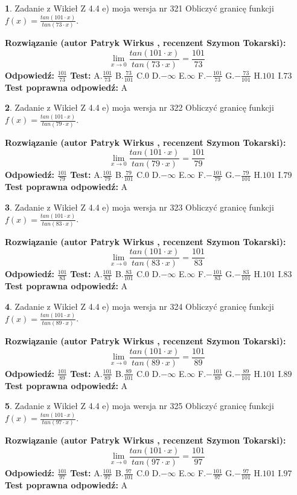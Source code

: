 \documentclass[12pt, a4paper]{article}
\theoremstyle{definition} %
\newtheorem{zad}{}
\newcommand{\zadStart}[1]{\begin{zad}#1\newline}
\newcommand{\zadStop}{\end{zad}}
\newcommand{\rozwStart}[2]{\noindent \textbf{Rozwiązanie (autor #1 , recenzent #2): }\newline}
\newcommand{\rozwStop}{\newline}
\newcommand{\odpStart}{\noindent \textbf{Odpowiedź:}\newline}
\newcommand{\odpStop}{\newline}
\newcommand{\testStart}{\noindent \textbf{Test:}\newline}
\newcommand{\testStop}{\newline}
\newcommand{\kluczStart}{\noindent \textbf{Test poprawna odpowiedź:}\newline}
\newcommand{\kluczStop}{\newline}
\begin{document}
\zadStart{Zadanie z Wikieł Z 4.4 e) moja wersja nr 321}
Obliczyć granicę funkcji $f(x)=\frac{tan(101\cdot x)}{tan(73\cdot x)}$.
\zadStop
\rozwStart{Patryk Wirkus}{Szymon Tokarski}
$$\lim\limits_{x\to 0}\frac{tan(101\cdot x)}{tan(73\cdot x)}=
\frac{101}{73}$$
\rozwStop
\odpStart
$\frac{101}{73}$
\odpStop
\testStart
A.$\frac{101}{73}$
B.$\frac{73}{101}$
C.$0$
D.$-\infty$
E.$\infty$
F.$-\frac{101}{73}$
G.$-\frac{73}{101}$
H.$101$
I.$73$
\testStop
\kluczStart
A
\kluczStop



\zadStart{Zadanie z Wikieł Z 4.4 e) moja wersja nr 322}
Obliczyć granicę funkcji $f(x)=\frac{tan(101\cdot x)}{tan(79\cdot x)}$.
\zadStop
\rozwStart{Patryk Wirkus}{Szymon Tokarski}
$$\lim\limits_{x\to 0}\frac{tan(101\cdot x)}{tan(79\cdot x)}=
\frac{101}{79}$$
\rozwStop
\odpStart
$\frac{101}{79}$
\odpStop
\testStart
A.$\frac{101}{79}$
B.$\frac{79}{101}$
C.$0$
D.$-\infty$
E.$\infty$
F.$-\frac{101}{79}$
G.$-\frac{79}{101}$
H.$101$
I.$79$
\testStop
\kluczStart
A
\kluczStop



\zadStart{Zadanie z Wikieł Z 4.4 e) moja wersja nr 323}
Obliczyć granicę funkcji $f(x)=\frac{tan(101\cdot x)}{tan(83\cdot x)}$.
\zadStop
\rozwStart{Patryk Wirkus}{Szymon Tokarski}
$$\lim\limits_{x\to 0}\frac{tan(101\cdot x)}{tan(83\cdot x)}=
\frac{101}{83}$$
\rozwStop
\odpStart
$\frac{101}{83}$
\odpStop
\testStart
A.$\frac{101}{83}$
B.$\frac{83}{101}$
C.$0$
D.$-\infty$
E.$\infty$
F.$-\frac{101}{83}$
G.$-\frac{83}{101}$
H.$101$
I.$83$
\testStop
\kluczStart
A
\kluczStop



\zadStart{Zadanie z Wikieł Z 4.4 e) moja wersja nr 324}
Obliczyć granicę funkcji $f(x)=\frac{tan(101\cdot x)}{tan(89\cdot x)}$.
\zadStop
\rozwStart{Patryk Wirkus}{Szymon Tokarski}
$$\lim\limits_{x\to 0}\frac{tan(101\cdot x)}{tan(89\cdot x)}=
\frac{101}{89}$$
\rozwStop
\odpStart
$\frac{101}{89}$
\odpStop
\testStart
A.$\frac{101}{89}$
B.$\frac{89}{101}$
C.$0$
D.$-\infty$
E.$\infty$
F.$-\frac{101}{89}$
G.$-\frac{89}{101}$
H.$101$
I.$89$
\testStop
\kluczStart
A
\kluczStop



\zadStart{Zadanie z Wikieł Z 4.4 e) moja wersja nr 325}
Obliczyć granicę funkcji $f(x)=\frac{tan(101\cdot x)}{tan(97\cdot x)}$.
\zadStop
\rozwStart{Patryk Wirkus}{Szymon Tokarski}
$$\lim\limits_{x\to 0}\frac{tan(101\cdot x)}{tan(97\cdot x)}=
\frac{101}{97}$$
\rozwStop
\odpStart
$\frac{101}{97}$
\odpStop
\testStart
A.$\frac{101}{97}$
B.$\frac{97}{101}$
C.$0$
D.$-\infty$
E.$\infty$
F.$-\frac{101}{97}$
G.$-\frac{97}{101}$
H.$101$
I.$97$
\testStop
\kluczStart
A
\kluczStop
\end{document}
